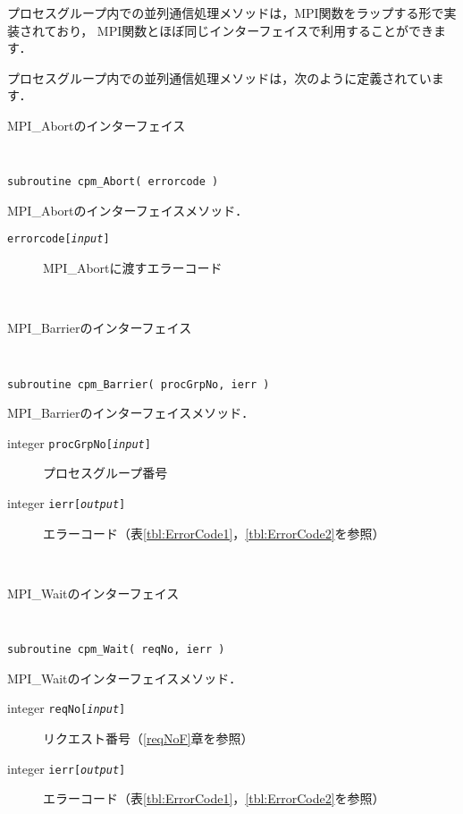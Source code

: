 プロセスグループ内での並列通信処理メソッドは，MPI関数をラップする形で実装されており，
MPI関数とほぼ同じインターフェイスで利用することができます．

プロセスグループ内での並列通信処理メソッドは，次のように定義されています．\\

\begin{spacing}{0.8}
\begin{itembox}[l]{MPI\_Abortのインターフェイス}
{\tt
\begin{verbatim}
subroutine cpm_Abort( errorcode )
\end{verbatim}
}
MPI\_Abortのインターフェイスメソッド．
\begin{description}
\item[{\tt errorcode[{\it input}]}] MPI\_Abortに渡すエラーコード
\end{description}
\end{itembox}\\
\end{spacing}

\begin{spacing}{0.8}
\begin{itembox}[l]{MPI\_Barrierのインターフェイス}
{\tt
\begin{verbatim}
subroutine cpm_Barrier( procGrpNo, ierr )
\end{verbatim}
}
MPI\_Barrierのインターフェイスメソッド．
\begin{description}
\item[integer {\tt procGrpNo[{\it input}]}] プロセスグループ番号
\item[integer {\tt ierr[{\it output}]}] エラーコード（表\ref{tbl:ErrorCode1}，\ref{tbl:ErrorCode2}を参照）
\end{description}
\end{itembox}\\
\end{spacing}

\begin{spacing}{0.8}
\begin{itembox}[l]{MPI\_Waitのインターフェイス}
{\tt
\begin{verbatim}
subroutine cpm_Wait( reqNo, ierr )
\end{verbatim}
}
MPI\_Waitのインターフェイスメソッド．
\begin{description}
\item[integer {\tt reqNo[{\it input}]}] リクエスト番号（\ref{reqNoF}章を参照）
\item[integer {\tt ierr[{\it output}]}] エラーコード（表\ref{tbl:ErrorCode1}，\ref{tbl:ErrorCode2}を参照）
\end{description}
\end{itembox}\\
\end{spacing}

